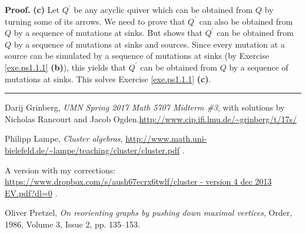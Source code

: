 \documentclass[numbers=enddot,12pt,final,onecolumn,notitlepage]{scrartcl}%
\numberwithin{exer}{section}
\theoremstyle{definition}
\newenvironment{proof}[1][Proof]{\noindent\textbf{#1.} }{\ \rule{0.5em}{0.5em}}
\newenvironment{verlong}{}{}
\begin{document}
\begin{proof}
\textbf{(c)} Let $Q^{\prime}$ be any acyclic quiver which can be obtained from
$Q$ by turning some of its arrows. We need to prove that $Q^{\prime}$ can also
be obtained from $Q$ by a sequence of mutations at sinks. But \cite[proof of
Proposition 2.2.8]{Lampe} shows that $Q^{\prime}$ can be obtained from $Q$ by
a sequence of mutations at sinks and sources. Since every mutation at a source
can be simulated by a sequence of mutations at sinks (by Exercise
\ref{exe.ps1.1.1} \textbf{(b)}), this yields that $Q^{\prime}$ can be obtained
from $Q$ by a sequence of mutations at sinks. This solves Exercise
\ref{exe.ps1.1.1} \textbf{(c)}.
\end{proof}

\begin{thebibliography}{9999999}                                                                                          %


Darij Grinberg, \textit{UMN Spring 2017 Math 5707 Midterm
\#3}, with solutions by Nicholas Rancourt and Jacob Ogden.\newline\url{http://www.cip.ifi.lmu.de/~grinberg/t/17s/}

Philipp Lampe, \textit{Cluster algebras},\newline%
\url{http://www.math.uni-bielefeld.de/~lampe/teaching/cluster/cluster.pdf} .

\begin{verlong}
A version with my corrections:\newline%
\url{https://www.dropbox.com/s/aush67ecrx6twlf/cluster - version 4 dec 2013 EV.pdf?dl=0}
.
\end{verlong}

Oliver Pretzel, \textit{On reorienting graphs by
pushing down maximal vertices}, Order, 1986, Volume 3, Issue 2, pp. 135--153.
\end{thebibliography}
\end{document}
